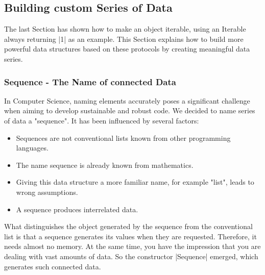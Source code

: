 \subsection{Building custom Series of Data}
\label{sub:Building custom Series of Data}
The last Section has shown how to make an object iterable, using an Iterable
always returning |1| as an example. This Section explains how to build more
powerful data structures based on these protocols by creating meaningful data
series.

\subsubsection{Sequence - The Name of connected Data}
\label{subsub:Sequence - The Name of connected Data}
In Computer Science, naming elements accurately poses a significant challenge 
when aiming to develop sustainable and robust code. We decided to name series
of data a "sequence". It has been influenced by several factors:

\begin{itemize}
  \item Sequences are not conventional lists known from other programming
    languages.
\item The name sequence is already known from mathematics.
\item Giving this data structure a more familiar name, for example "list",
  leads to wrong assumptions. 
\item A sequence produces interrelated data.
\end{itemize}
What distinguishes the object generated by the sequence from the conventional
list is that a sequence generates its values when they are requested.
Therefore, it needs almost no memory. At the same time, you have the impression
that you are dealing with vast amounts of data. So the constructor |Sequence|
emerged, which generates such connected data.

